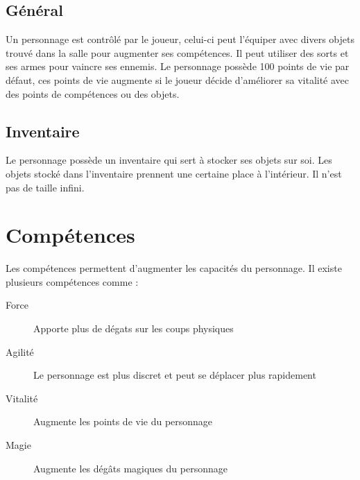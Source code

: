 \documentclass[11pt, a4paper, oneside]{report}
\begin{document}
\subsection{Général}
Un personnage est contrôlé par le joueur, celui-ci peut l'équiper avec divers objets trouvé dans la salle pour augmenter ses compétences. Il peut utiliser des sorts et ses armes pour vaincre ses ennemis. Le personnage possède 100 points de vie par défaut, ces points de vie augmente si le joueur décide d'améliorer sa vitalité avec des points de compétences ou des objets.
\subsection{Inventaire}
Le personnage possède un inventaire qui sert à stocker ses objets sur soi. Les objets stocké dans l'inventaire prennent une certaine place à l'intérieur. Il n'est pas de taille infini.
\section{Compétences}
Les compétences permettent d'augmenter les capacités du personnage. Il existe plusieurs compétences comme :

\begin{description}
	\item[Force] Apporte plus de dégats sur les coups physiques
	\item[Agilité] Le personnage est plus discret et peut se déplacer plus rapidement
	\item[Vitalité] Augmente les points de vie du personnage
	\item[Magie] Augmente les dégâts magiques du personnage
\end{description}
\end{document}

